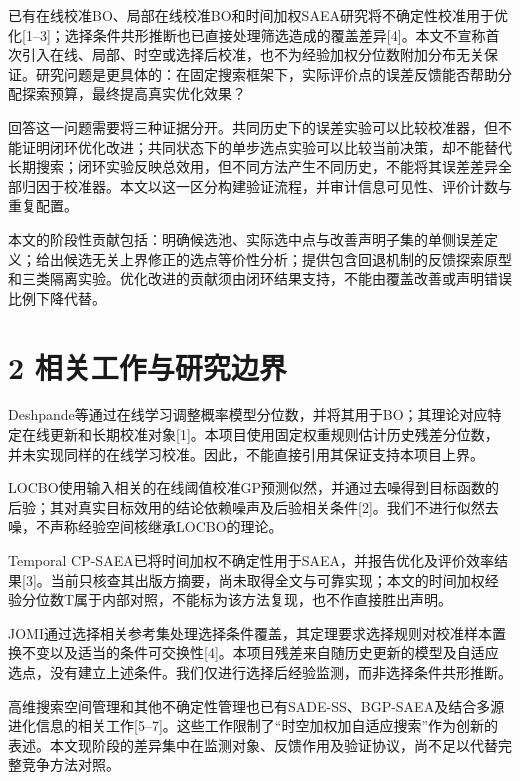 \documentclass[11pt,a4paper]{article}
\begin{document}
已有在线校准BO、局部在线校准BO和时间加权SAEA研究将不确定性校准用于优化{[}1--3{]}；选择条件共形推断也已直接处理筛选造成的覆盖差异{[}4{]}。本文不宣称首次引入在线、局部、时空或选择后校准，也不为经验加权分位数附加分布无关保证。研究问题是更具体的：在固定搜索框架下，实际评价点的误差反馈能否帮助分配探索预算，最终提高真实优化效果？

回答这一问题需要将三种证据分开。共同历史下的误差实验可以比较校准器，但不能证明闭环优化改进；共同状态下的单步选点实验可以比较当前决策，却不能替代长期搜索；闭环实验反映总效用，但不同方法产生不同历史，不能将其误差差异全部归因于校准器。本文以这一区分构建验证流程，并审计信息可见性、评价计数与重复配置。

本文的阶段性贡献包括：明确候选池、实际选中点与改善声明子集的单侧误差定义；给出候选无关上界修正的选点等价性分析；提供包含回退机制的反馈探索原型和三类隔离实验。优化改进的贡献须由闭环结果支持，不能由覆盖改善或声明错误比例下降代替。

\hypertarget{ux76f8ux5173ux5de5ux4f5cux4e0eux7814ux7a76ux8fb9ux754c}{%
\section{2
相关工作与研究边界}\label{ux76f8ux5173ux5de5ux4f5cux4e0eux7814ux7a76ux8fb9ux754c}}

Deshpande等通过在线学习调整概率模型分位数，并将其用于BO；其理论对应特定在线更新和长期校准对象{[}1{]}。本项目使用固定权重规则估计历史残差分位数，并未实现同样的在线学习校准。因此，不能直接引用其保证支持本项目上界。

LOCBO使用输入相关的在线阈值校准GP预测似然，并通过去噪得到目标函数的后验；其对真实目标效用的结论依赖噪声及后验相关条件{[}2{]}。我们不进行似然去噪，不声称经验空间核继承LOCBO的理论。

Temporal
CP-SAEA已将时间加权不确定性用于SAEA，并报告优化及评价效率结果{[}3{]}。当前只核查其出版方摘要，尚未取得全文与可靠实现；本文的时间加权经验分位数T属于内部对照，不能标为该方法复现，也不作直接胜出声明。

JOMI通过选择相关参考集处理选择条件覆盖，其定理要求选择规则对校准样本置换不变以及适当的条件可交换性{[}4{]}。本项目残差来自随历史更新的模型及自适应选点，没有建立上述条件。我们仅进行选择后经验监测，而非选择条件共形推断。

高维搜索空间管理和其他不确定性管理也已有SADE-SS、BGP-SAEA及结合多源进化信息的相关工作{[}5--7{]}。这些工作限制了``时空加权加自适应搜索''作为创新的表述。本文现阶段的差异集中在监测对象、反馈作用及验证协议，尚不足以代替完整竞争方法对照。
\end{document}
